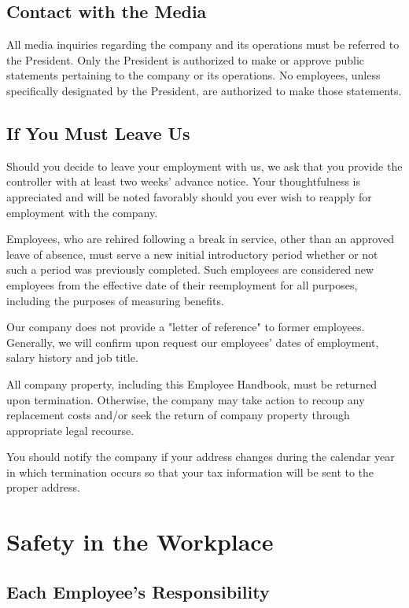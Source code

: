 \subsection{Contact with the Media}

All media inquiries regarding the company and its operations must be referred to the President. Only the President is authorized to make or approve public statements pertaining to the company or its operations. No employees, unless specifically designated by the President, are authorized to make those statements.

\subsection{If You Must Leave Us}

Should you decide to leave your employment with us, we ask that you provide the controller with at least two weeks' advance notice. Your thoughtfulness is appreciated and will be noted favorably should you ever wish to reapply for employment with the company.

Employees, who are rehired following a break in service, other than an approved leave of absence, must serve a new initial introductory period whether or not such a period was previously completed. Such employees are considered new employees from the effective date of their reemployment for all purposes, including the purposes of measuring benefits.

Our company does not provide a "letter of reference" to former employees. Generally, we will confirm upon request our employees' dates of employment, salary history and job title.

All company property, including this Employee Handbook, must be returned upon termination. Otherwise, the company may take action to recoup any replacement costs and/or seek the return of company property through appropriate legal recourse.

You should notify the company if your address changes during the calendar year in which termination occurs so that your tax information will be sent to the proper address.

\section{Safety in the Workplace}

\subsection{Each Employee's Responsibility}

